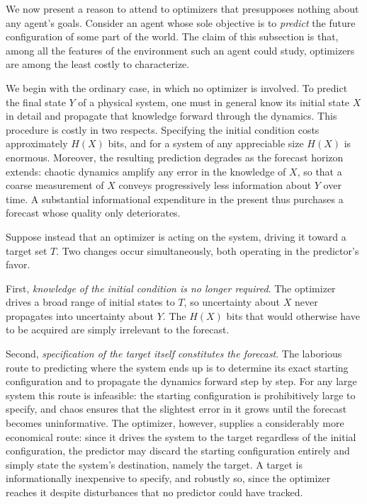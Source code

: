 \documentclass[10pt]{article}
\theoremstyle{definition}
\theoremstyle{remark}
\begin{document}
We now present a reason to attend to optimizers that presupposes nothing about any agent's goals. Consider an agent whose sole objective is to \emph{predict} the future configuration of some part of the world. The claim of this subsection is that, among all the features of the environment such an agent could study, optimizers are among the least costly to characterize.

We begin with the ordinary case, in which no optimizer is involved. To predict the final state $Y$ of a physical system, one must in general know its initial state $X$ in detail and propagate that knowledge forward through the dynamics. This procedure is costly in two respects. Specifying the initial condition costs approximately $H(X)$ bits, and for a system of any appreciable size $H(X)$ is enormous. Moreover, the resulting prediction degrades as the forecast horizon extends: chaotic dynamics amplify any error in the knowledge of $X$, so that a coarse measurement of $X$ conveys progressively less information about $Y$ over time. A substantial informational expenditure in the present thus purchases a forecast whose quality only deteriorates.

Suppose instead that an optimizer is acting on the system, driving it toward a target set $T$. Two changes occur simultaneously, both operating in the predictor's favor.

First, \emph{knowledge of the initial condition is no longer required}. The optimizer drives a broad range of initial states to $T$, so uncertainty about $X$ never propagates into uncertainty about $Y$. The $H(X)$ bits that would otherwise have to be acquired are simply irrelevant to the forecast.

Second, \emph{specification of the target itself constitutes the forecast}. The laborious route to predicting where the system ends up is to determine its exact starting configuration and to propagate the dynamics forward step by step. For any large system this route is infeasible: the starting configuration is prohibitively large to specify, and chaos ensures that the slightest error in it grows until the forecast becomes uninformative. The optimizer, however, supplies a considerably more economical route: since it drives the system to the target regardless of the initial configuration, the predictor may discard the starting configuration entirely and simply state the system's destination, namely the target. A target is informationally inexpensive to specify, and robustly so, since the optimizer reaches it despite disturbances that no predictor could have tracked.
\end{document}
